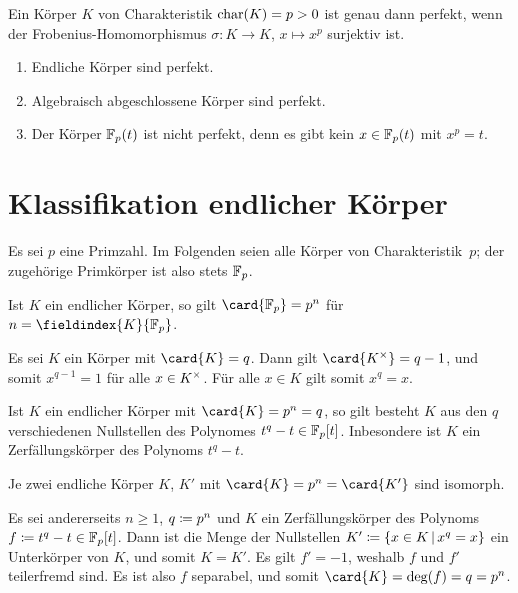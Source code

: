 \begin{proposition}
  Ein Körper $K$ von Charakteristik $\operatorname{char}(K) = p > 0$ ist genau dann perfekt, wenn der Frobenius-Homomorphismus $\sigma \colon K \to K$, $x \mapsto x^p$ surjektiv ist.
\end{proposition}

\begin{example}
  \begin{enumerate}
    \item
      Endliche Körper sind perfekt.
    \item
      Algebraisch abgeschlossene Körper sind perfekt.
    \item
      Der Körper $\mathbb{F}_p(t)$ ist nicht perfekt, denn es gibt kein $x \in \mathbb{F}_p(t)$ mit $x^p = t$.
  \end{enumerate}
\end{example}




\section{Klassifikation endlicher Körper}

Es sei $p$ eine Primzahl.
Im Folgenden seien alle Körper von Charakteristik~$p$;
der zugehörige Primkörper ist also stets $\mathbb{F}_p$.

\begin{lemma}
  Ist $K$ ein endlicher Körper, so gilt $\card{\Finite_p} = p^n$ für $n = \fieldindex{K}{\Finite_p}$.
\end{lemma}

Es sei $K$ ein Körper mit $\card{K} = q$.
Dann gilt $\card{\unitgroup{K}} = q-1$, und somit $x^{q-1} = 1$ für alle $x \in K^{\times}$.
Für alle $x \in K$ gilt somit $x^q = x$.

\begin{lemma}
  Ist $K$ ein endlicher Körper mit $\card{K} = p^n = q$, so gilt besteht $K$ aus den $q$ verschiedenen Nullstellen des Polynomes $t^q - t \in \mathbb{F}_p[t]$.
  Inbesondere ist $K$ ein Zerfällungskörper des Polynoms $t^q - t$.
\end{lemma}

\begin{corollary}
  Je zwei endliche Körper $K$, $K'$ mit $\card{K} = p^n = \card{K'}$ sind isomorph.
\end{corollary}

Es sei andererseits $n \geq 1$, $q \coloneqq p^n$ und $K$ ein Zerfällungskörper des Polynoms $f \coloneqq t^q - t \in \mathbb{F}_p[t]$.
Dann ist die Menge der Nullstellen $K' \defined \{x \in K \suchthat x^q = x \}$ ein Unterkörper von $K$, und somit $K = K'$.
Es gilt $f' = -1$, weshalb $f$ und $f'$ teilerfremd sind.
Es ist also $f$ separabel, und somit $\card{K} = \deg(f) = q = p^n$.

